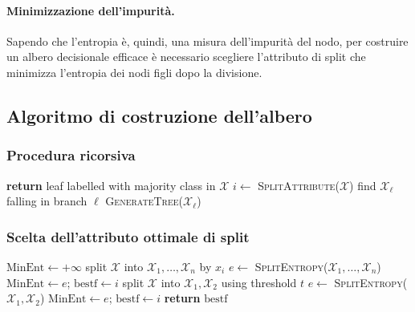 \paragraph{Minimizzazione dell'impurità.}
Sapendo che l'entropia è, quindi, una misura dell'impurità del nodo, per costruire un albero decisionale efficace è necessario scegliere l'attributo di split che minimizza l'entropia dei nodi figli dopo la divisione.

\subsection{Algoritmo di costruzione dell'albero}
\subsubsection*{Procedura ricorsiva}

\begin{algorithm}[H]
\caption{\textsc{GenerateTree}($\mathcal{X}$)}
\begin{algorithmic}[1]
    \State \textbf{return} leaf labelled with majority class in $\mathcal{X}$
\EndIf
\State $i \gets$ \textsc{SplitAttribute}($\mathcal{X}$)
    \State find $\mathcal{X}_\ell$ falling in branch $\ell$
    \State \textsc{GenerateTree}($\mathcal{X}_\ell$)
\EndFor
\end{algorithmic}
\end{algorithm}

\subsubsection*{Scelta dell'attributo ottimale di split}
\begin{algorithm}[H]
\caption{\textsc{SplitAttribute}($\mathcal{X}$)}
\begin{algorithmic}[1]
\State $\text{MinEnt} \gets +\infty$
        \State split $\mathcal{X}$ into $\mathcal{X}_1,\dots,\mathcal{X}_n$ by $x_i$
        \State $e \gets$ \textsc{SplitEntropy}($\mathcal{X}_1,\dots,\mathcal{X}_n$)
            \State $\text{MinEnt} \gets e$;\;\; $\text{bestf} \gets i$
        \EndIf
    \Else {}
            \State split $\mathcal{X}$ into $\mathcal{X}_1,\mathcal{X}_2$ using threshold $t$
            \State $e \gets$ \textsc{SplitEntropy}($\mathcal{X}_1,\mathcal{X}_2$)
                \State $\text{MinEnt} \gets e$;\;\; $\text{bestf} \gets i$
            \EndIf
        \EndFor
    \EndIf
\EndFor
\State \textbf{return} $\text{bestf}$
\end{algorithmic}
\end{algorithm}


